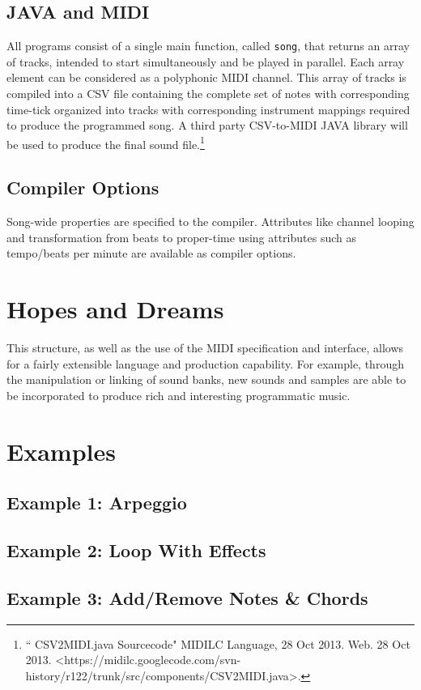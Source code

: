 \documentclass[letterpaper]{article}
\begin{document}
\subsection{JAVA and MIDI}
All programs consist of a single main function, called \texttt{song}, that returns an array of tracks, intended to start simultaneously and be played in parallel. Each array element can be considered as a polyphonic MIDI channel. This array of tracks is compiled into a CSV file containing the complete set of notes with corresponding time-tick organized into tracks with corresponding instrument mappings required to produce the programmed song. A third party CSV-to-MIDI JAVA library  will be used to produce the final sound file.\footnote[1]{`` CSV2MIDI.java Sourcecode" MIDILC Language, 28 Oct 2013. Web. 28 Oct 2013. \textless https://midilc.googlecode.com/svn-history/r122/trunk/src/components/CSV2MIDI.java\textgreater.}

\subsection{Compiler Options}
Song-wide properties are specified to the compiler. Attributes like channel looping and transformation from beats to proper-time using attributes such as tempo/beats per minute are available as compiler options.

\section{Hopes and Dreams}
This structure, as well as the use of the MIDI specification and interface, allows for a fairly extensible language and production capability. For example, through the manipulation or linking of sound banks, new sounds and samples are able to be incorporated to produce rich and interesting programmatic music.

\section{Examples}

\begin{minipage}{\linewidth}
\subsection{Example 1: Arpeggio}
%
\end{minipage}

\begin{minipage}{\linewidth}
\subsection{Example 2: Loop With Effects}
%
\end{minipage}

\begin{minipage}{\linewidth}
\subsection{Example 3: Add/Remove Notes \& Chords}
%
\end{minipage}
\end{document}
